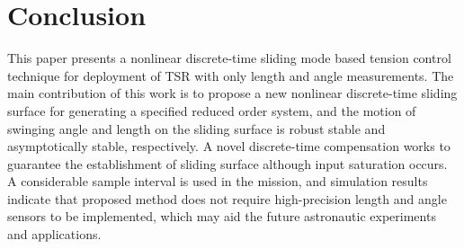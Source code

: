 \documentclass[10pt,onecolumn,draftcls]{IEEEtran}
\begin{document}
\section{Conclusion}
This paper presents a nonlinear discrete-time sliding mode based tension control technique for deployment of TSR with only length and angle measurements. The main contribution of this work is to propose a new nonlinear discrete-time sliding surface for generating a specified reduced order  system, and the motion of swinging angle and length on the sliding surface is robust stable and asymptotically stable, respectively. A novel discrete-time compensation works to guarantee the establishment of sliding surface although input saturation occurs. A considerable sample interval is used in the mission, and simulation results indicate that proposed method does not require high-precision length and angle sensors to be implemented, which may aid the future astronautic experiments and applications. 





%


\end{document}
